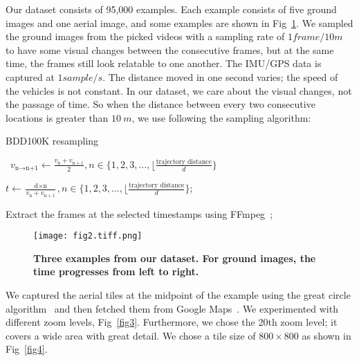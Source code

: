 \documentclass[10pt,letterpaper]{article}
\begin{document}
Our dataset consists of 95,000 examples. Each example consists of five ground images and one aerial image, and some examples are shown in Fig~\ref{fig2}. We sampled the ground images from the picked videos with a sampling rate of $1 frame/10 m$ to have some visual changes between the consecutive frames, but at the same time, the frames still look relatable to one another. The IMU/GPS data is captured at $1 sample/s$. The distance moved in one second varies; the speed of the vehicles is not constant. In our dataset, we care about the visual changes, not the passage of time. So when the distance between every two consecutive locations is greater than $10 \ m$,  we use following the sampling algorithm:

\begin{algorithm}[!h]
\caption{BDD100K resampling}
\
$v_{\text{n} \to \text{n+1}} \gets \frac{v_{\text{n}} + v_{\text{n} + 1}}{2}, n \in \{1, 2, 3, \text{\ldots}, \lfloor\frac{\text{trajectory distance}}{d} \}$ \;

\Comment{To get the timestamp of the nth frame ($t_{\text{n}}$)}

$t \gets \frac{\text{d} \times  \text{n}}{v_{\text{n}} + v_{\text{n} + 1}} , n \in \{1, 2, 3, \text{\ldots}, \lfloor\frac{\text{trajectory distance}}{d} \} $;\

Extract the frames at the selected timestamps using FFmpeg~\cite{bib23};\
\end{algorithm}

\begin{figure}[!h]
  \caption{{\bf Three examples from our dataset. For ground images, the time progresses from left to right.}}
  \texttt{[image: fig2.tiff.png]}
  \label{fig2}
\end{figure}

We captured the aerial tiles at the midpoint of the example using the great circle algorithm~\cite{bib16} and then fetched them from Google Maps~\cite{bib15}. We experimented with different zoom levels, Fig~\ref{fig3}. Furthermore, we chose the 20th zoom level; it covers a wide area with great detail. We chose a tile size of  $800 \times 800$ as shown in Fig~\ref{fig4}.
\end{document}
